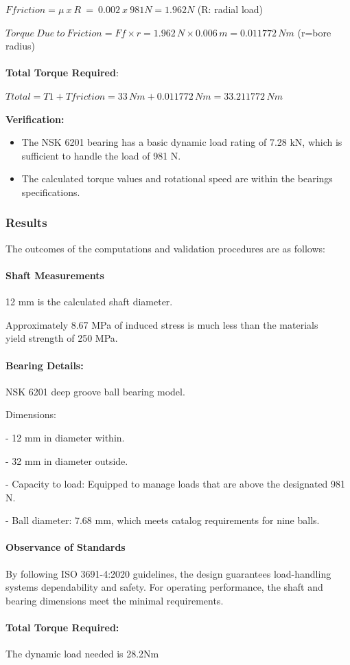 \documentclass[../../main]{subfiles}
\begin{document}
\(Ffriction = \mu\ x\ R\  = \ 0.002\ x\ 981N = 1.962N\) (R: radial load)

\(Torque\ Due\ to\ Friction = Ff \times r = 1.962\, N \times 0.006\, m = 0.011772\, Nm\)
(r=bore radius)
\\ \\
\textbf{Total Torque Required}:

\(Ttotal = T1 + Tfriction = 33\, Nm + 0.011772\, Nm = 33.211772\, Nm\)

\textbf{Verification:}

\begin{itemize}
\item
  The NSK 6201 bearing has a basic dynamic load rating of 7.28 kN, which
  is sufficient to handle the load of 981 N.
\item
  The calculated torque values and rotational speed are within the
  bearing\textquotesingle s specifications.
\end{itemize}

\subsubsection{Results}

The outcomes of the computations and validation procedures are as
follows:

\paragraph{Shaft Measurements}

12 mm is the calculated shaft diameter.

Approximately 8.67 MPa of induced stress is much less than the
material\textquotesingle s \\ yield strength of 250 MPa.

\paragraph{Bearing Details:}
NSK 6201 deep groove ball bearing model.

Dimensions:

- 12 mm in diameter within.

- 32 mm in diameter outside.

- Capacity to load: Equipped to manage loads that are above the
designated 981 N.

- Ball diameter: 7.68 mm, which meets catalog requirements for nine
balls.

\paragraph{Observance of Standards}
By following ISO 3691-4:2020 guidelines, the design guarantees
load-handling systems\textquotesingle{} dependability and safety. For
operating performance, the shaft and bearing dimensions meet the minimal
requirements.

\paragraph{Total Torque Required:}

The dynamic load needed is 28.2Nm
\end{document}
